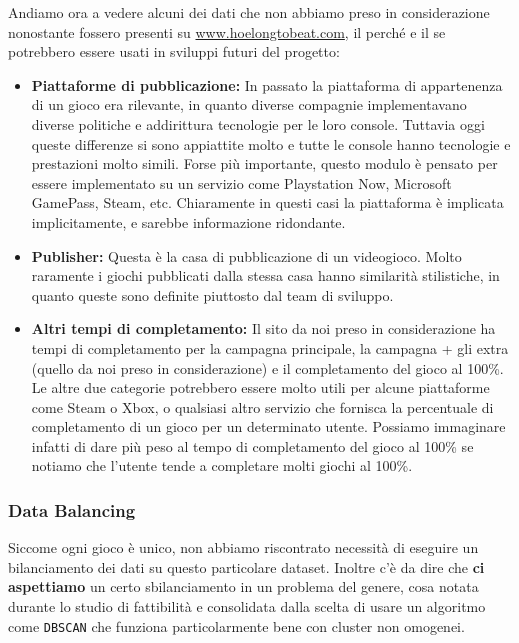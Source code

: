             Andiamo ora a vedere alcuni dei dati che non abbiamo preso in considerazione nonostante fossero presenti su \url{www.hoelongtobeat.com}, il perché e il se potrebbero essere usati in sviluppi futuri del progetto:
            \begin{itemize}
                \item \textbf{Piattaforme di pubblicazione:} In passato la piattaforma di appartenenza di un gioco era rilevante, in quanto diverse compagnie implementavano diverse politiche e addirittura tecnologie per le loro console. Tuttavia oggi queste differenze si sono appiattite molto e tutte le console hanno tecnologie e prestazioni molto simili. Forse più importante, questo modulo è pensato per essere implementato su un servizio come Playstation Now, Microsoft GamePass, Steam, etc. Chiaramente in questi casi la piattaforma è implicata implicitamente, e sarebbe informazione ridondante.
                
                \item \textbf{Publisher:} Questa è la casa di pubblicazione di un videogioco. Molto raramente i giochi pubblicati dalla stessa casa hanno similarità stilistiche, in quanto queste sono definite piuttosto dal team di sviluppo.
                
                \item \textbf{Altri tempi di completamento:} Il sito da noi preso in considerazione ha tempi di completamento per la campagna principale, la campagna + gli extra (quello da noi preso in considerazione) e il completamento del gioco al 100\%. Le altre due categorie potrebbero essere molto utili per alcune piattaforme come Steam o Xbox, o qualsiasi altro servizio che fornisca la percentuale di completamento di un gioco per un determinato utente. Possiamo immaginare infatti di dare più peso al tempo di completamento del gioco al 100\% se notiamo che l'utente tende a completare molti giochi al 100\%.
            \end{itemize}
            
        \subsubsection{Data Balancing}
            Siccome ogni gioco è unico, non abbiamo riscontrato necessità di eseguire un bilanciamento dei dati su questo particolare dataset. Inoltre c'è da dire che \textbf{ci aspettiamo} un certo sbilanciamento in un problema del genere, cosa notata durante lo studio di fattibilità e consolidata dalla scelta di usare un algoritmo come \texttt{DBSCAN} che funziona particolarmente bene con cluster non omogenei.